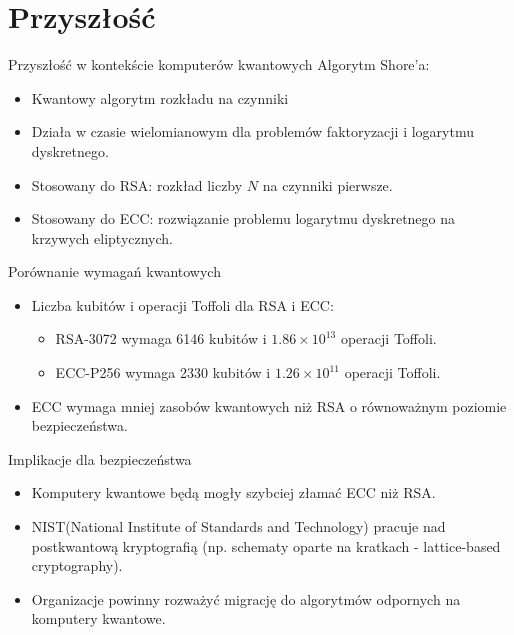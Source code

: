 \section{Przyszłość}
\begin{frame}{Przyszłość w kontekście komputerów kwantowych}
       Algorytm Shore'a:
        \begin{itemize}
            \item Kwantowy algorytm rozkładu na czynniki
            \item Działa w czasie wielomianowym dla problemów faktoryzacji i logarytmu dyskretnego.
            \item Stosowany do RSA: rozkład liczby $N$ na czynniki pierwsze.
            \item Stosowany do ECC: rozwiązanie problemu logarytmu dyskretnego na krzywych eliptycznych.
        \end{itemize}
\end{frame}
\begin{frame}{Porównanie wymagań kwantowych}
    \begin{itemize}
        \item Liczba kubitów i operacji Toffoli dla RSA i ECC: \cite{quantum}
        \begin{itemize}
            \item RSA-3072 wymaga 6146 kubitów i $1.86 \times 10^{13}$ operacji Toffoli.
            \item ECC-P256 wymaga 2330 kubitów i $1.26 \times 10^{11}$ operacji Toffoli.
        \end{itemize}
        \item ECC wymaga mniej zasobów kwantowych niż RSA o równoważnym poziomie bezpieczeństwa.
    \end{itemize}
\end{frame}
\begin{frame}{Implikacje dla bezpieczeństwa}
    \begin{itemize}
        \item Komputery kwantowe będą mogły szybciej złamać ECC niż RSA.
        \item NIST(National Institute of Standards and Technology) pracuje nad postkwantową kryptografią (np. schematy oparte na kratkach - lattice-based cryptography).
        \item Organizacje powinny rozważyć migrację do algorytmów odpornych na komputery kwantowe.
    \end{itemize}
\end{frame}
